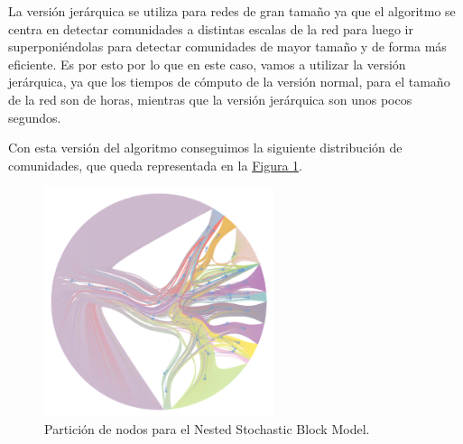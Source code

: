\documentclass[paper=a4, fontsize=11pt]{article} %
\numberwithin{equation}{section} %
\numberwithin{figure}{section} %
\numberwithin{table}{section} %
\begin{document}
La versión jerárquica se utiliza para redes de gran tamaño ya que el algoritmo se centra en detectar comunidades a distintas escalas de la red para luego ir superponiéndolas para detectar comunidades de mayor tamaño y de forma más eficiente. Es por esto por lo que en este caso, vamos a utilizar la versión jerárquica, ya que los tiempos de cómputo de la versión normal, para el tamaño de la red son de horas, mientras que la versión jerárquica son unos pocos segundos.

Con esta versión del algoritmo conseguimos la siguiente distribución de comunidades, que queda representada en la \hyperref[im9]{Figura \ref*{im9}}.

\begin{figure}[H]
  \centering
  \includegraphics[width=0.6\textwidth]{img/stoc}
  \caption{Partición de nodos para el Nested Stochastic Block Model.}
  \label{im9}
\end{figure}
\end{document}
